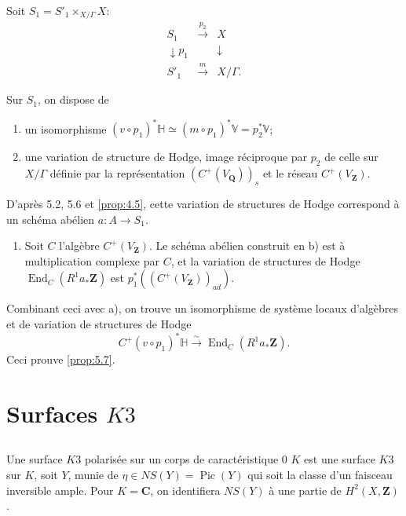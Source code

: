 \documentclass[11pt]{amsart}
\theoremstyle{plain}
\theoremstyle{definition}
\theoremstyle{remark}
\begin{document}
Soit $S_1=S'_1\times_{X/\Gamma}X$:
\begin{equation*}
\begin{array}{ccc}
S_1 & \xrightarrow{p_2} & X \\
\downarrow{p_1} & & \downarrow \\
S'_1 & \xrightarrow{m} & X/\Gamma.
\end{array}
\end{equation*}

Sur $S_1$, on dispose de
\begin{enumerate}
\item[a)] un isomorphisme $(v\circ p_1)^*\mathbb{H}\simeq (m\circ p_1)^*\mathbb{V}=p_2^*\mathbb{V}$;
\item[b)] une variation de structure de Hodge, image r\'eciproque par $p_2$ de celle sur $X/\Gamma$ d\'efinie par la repr\'esentation $(C^+(V_\mathbf{Q}))_s$ et le r\'eseau $C^+(V_\mathbf{Z})$.
\end{enumerate}
D'apr\`es 5.2, 5.6 et \ref{prop:4.5}, cette variation de structures de Hodge correspond \`a un sch\'ema ab\'elien $a\colon A\to S_1$.
\begin{enumerate}
\item[c)] Soit $C$ l'alg\`ebre $C^+(V_\mathbf{Z})$. Le sch\'ema ab\'elien construit en b) est \`a multiplication complexe par $C$, et la variation de structures de Hodge $\operatorname{End}_C(R^1a_*\mathbf{Z})$ est $p_1^*((C^+(V_\mathbf{Z}))_{ad})$.
\end{enumerate}
Combinant ceci avec a), on trouve un isomorphisme de syst\`eme locaux d'alg\`ebres et de variation de structures de Hodge
\begin{equation*}
C^+(v\circ p_1)^*\mathbb{H}\xrightarrow{\sim}\operatorname{End}_C(R^1a_*\mathbf{Z}).
\end{equation*}
Ceci prouve \ref{prop:5.7}.

\section{Surfaces $K3$}

\subsection*{}
Une surface $K3$ polaris\'ee sur un corps de caract\'eristique $0$ $K$ est une surface $K3$ sur $K$, soit $Y$, munie de $\eta\in NS(Y)=\operatorname{Pic}(Y)$ qui soit la classe d'un faisceau inversible ample. Pour $K=\mathbf{C}$, on identifiera $NS(Y)$ \`a une partie de $H^2(X,\mathbf{Z})$.
\end{document}
